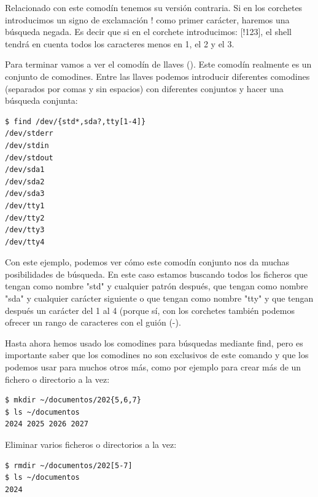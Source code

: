 Relacionado con este comodín tenemos su versión contraria. Si en los corchetes introducimos un signo de exclamación ! como primer carácter, haremos una búsqueda negada. Es decir que si en el corchete introducimos: [!123], el shell tendrá en cuenta todos los caracteres menos en 1, el 2 y el 3.

Para terminar vamos a ver el comodín de llaves ({}). Este comodín realmente es un conjunto de comodines. Entre las llaves podemos introducir diferentes comodines (separados por comas y sin espacios) con diferentes conjuntos y hacer una búsqueda conjunta:

\begin{tcolorbox-code}
\begin{lstlisting}
$ find /dev/{std*,sda?,tty[1-4]}
/dev/stderr
/dev/stdin
/dev/stdout
/dev/sda1
/dev/sda2
/dev/sda3
/dev/tty1
/dev/tty2
/dev/tty3
/dev/tty4
\end{lstlisting}
\end{tcolorbox-code}

Con este ejemplo, podemos ver cómo este comodín conjunto nos da muchas posibilidades de búsqueda. En este caso estamos buscando todos los ficheros que tengan como nombre "std" y cualquier patrón después, que tengan como nombre "sda" y cualquier carácter siguiente o que tengan como nombre "tty" y que tengan después un carácter del 1 al 4 (porque sí, con los corchetes también podemos ofrecer un rango de caracteres con el guión (-).

Hasta ahora hemos usado los comodines para búsquedas mediante find, pero es importante saber que los comodines no son exclusivos de este comando y que los podemos usar para muchos otros más, como por ejemplo para crear más de un fichero o directorio a la vez:

\begin{tcolorbox-code}
\begin{lstlisting}
$ mkdir ~/documentos/202{5,6,7}
$ ls ~/documentos
2024 2025 2026 2027
\end{lstlisting}
\end{tcolorbox-code}

Eliminar varios ficheros o directorios a la vez:

\begin{tcolorbox-code}
\begin{lstlisting}
$ rmdir ~/documentos/202[5-7]
$ ls ~/documentos
2024
\end{lstlisting}
\end{tcolorbox-code}

